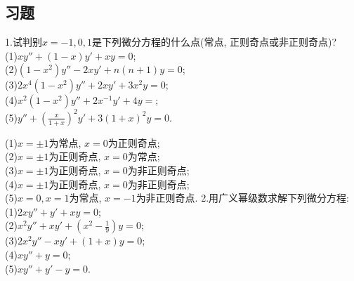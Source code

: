 \documentclass[titlepage,11pt,a4paper,twoside]{report}
\makeatletter
\newenvironment{solve}{\par
	\pushQED{\qed}%
	\normalfont \topsep1\p@\@plus6\p@\relax
	\trivlist
	\item\relax
	{\hspace*{\parindent}{\heiti 解}\@addpunct{:}}\hspace\labelsep\ignorespaces
}{%
	\popQED\endtrivlist\@endpefalse
}
\makeatother
\begin{document}
\subsection{习题}
1.试判别$x=-1,0,1$是下列微分方程的什么点(常点, 正则奇点或非正则奇点)?\\
(1)$xy''+(1-x)y'+xy=0$;\\
(2)$(1-x^2)y''-2xy'+n(n+1)y=0$;\\
(3)$2x^4(1-x^2)y''+2xy'+3x^2y=0$;\\
(4)$x^2(1-x^2)y''+2x^{-1}y'+4y=$;\\
(5)$\displaystyle y''+\left(\frac{x}{1+x}\right)^2y'+3(1+x)^2y=0$.
\begin{solve}
(1)$x=\pm1$为常点, $x=0$为正则奇点;\\
(2)$x=\pm1$为正则奇点, $x=0$为常点;\\
(3)$x=\pm1$为正则奇点, $x=0$为非正则奇点;\\
(4)$x=\pm1$为正则奇点, $x=0$为非正则奇点;\\
(5)$x=0,x=1$为常点, $x=-1$为非正则奇点.
\end{solve}
2.用广义幂级数求解下列微分方程:\\
(1)$2xy''+y'+xy=0$;\\
(2)$x^2y''+xy'+\left(x^2-\frac{1}{9}\right)y=0$;\\
(3)$2x^2y''-xy'+(1+x)y=0$;\\
(4)$xy''+y=0$;\\
(5)$xy''+y'-y=0$.
\end{document}
